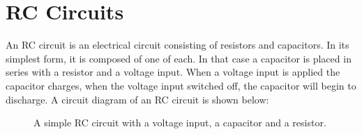 \chapter{RC Circuits} \label{chap:RC}
An RC circuit is an electrical circuit consisting of resistors and capacitors. In its simplest form, it is composed of one of each. In that case a capacitor is placed in series with a resistor and a voltage input. When a voltage input is applied the capacitor charges, when the voltage input switched off, the capacitor will begin to discharge. A circuit diagram of an RC circuit is shown below:
\\
\begin{figure}[H]
 
 \caption{A simple RC circuit with a voltage input, a capacitor and a resistor.}
\end{figure}
